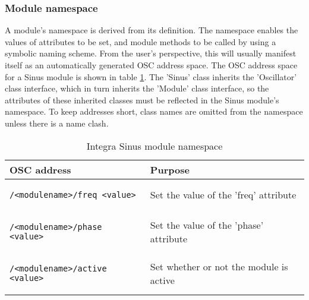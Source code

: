 {\subsubsection{Module namespace}\label{subsubsec:module_namespace}

A module's namespace is derived from its definition. The namespace
enables the values of attributes to be set, and module methods to be
called by using a symbolic naming scheme.  From the user's
perspective, this will usually manifest itself as an automatically
generated OSC address space. The OSC address space for a Sinus module
is shown in table \ref{tab:module_namespace}. The 'Sinus' class
inherits the 'Oscillator' class interface, which in turn inherits the
'Module' class interface, so the attributes of these inherited classes
must be reflected in the Sinus module's namespace. To keep addresses
short, class names are omitted from the namespace unless there is a
name clash.

\begin{table}
\begin{center}
\begin{tabular}{|p{13em}|p{8em}|}
\hline
\textbf{OSC address} & \textbf{Purpose} \\
\hline
\begin{minipage}[0pt]{10em}
\footnotesize {
\begin{verbatim}/<modulename>/freq <value>\end{verbatim}}\end{minipage}  & \small{Set the value of the 'freq' attribute} \\
\hline
\begin{minipage}[0pt]{10em}
\footnotesize {
\begin{verbatim}/<modulename>/phase <value>\end{verbatim}}\end{minipage}  & \small{Set the value of the 'phase' attribute} \\
\hline
\begin{minipage}[0pt]{10em}
\footnotesize {
\begin{verbatim}/<modulename>/active <value>
\end{verbatim}} \end{minipage} & \small{Set whether or not the module is active} \\
\hline
\end{tabular} 
\end{center}
\caption{Integra Sinus module namespace}
\label{tab:module_namespace}
\end{table}

}
